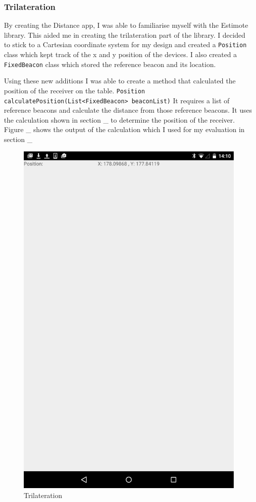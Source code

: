 \subsubsection{Trilateration} \label{nocamera_trilateration}

By creating the Distance app, I was able to familiarise myself with the Estimote library. This aided me in creating the trilateration part of the library. I decided to stick to a Cartesian coordinate system for my design and created a \lstinline|Position| class which kept track of the x and y position of the devices. I also created a \lstinline|FixedBeacon| class which stored the reference beacon and its location.

Using these new additions I was able to create a method that calculated the position of the receiver on the table. \lstinline|Position calculatePosition(List<FixedBeacon> beaconList)| It requires a list of reference beacons and calculate the distance from those reference beacons. It uses the calculation shown in section \_ to determine the position of the receiver. 
Figure \_ shows the output of the calculation which I used for my evaluation in section \_
\begin{figure}[h]
  \includegraphics[scale=0.2]{images/trilateration}
  \protect\caption{Trilateration}
  \label{trilateration}
\end{figure}

